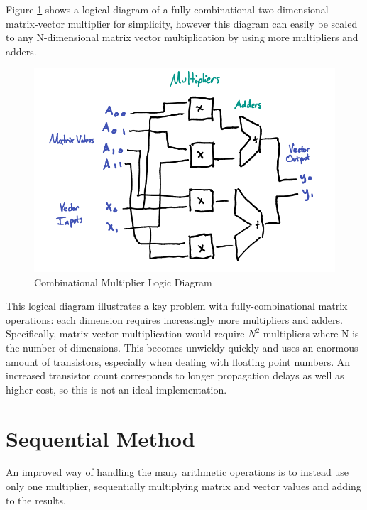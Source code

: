 \documentclass{article}
\begin{document}
Figure \ref{fig:comb_mult} shows a logical diagram of a fully-combinational two-dimensional matrix-vector multiplier for simplicity, however this diagram can easily be scaled to any N-dimensional matrix vector multiplication by using more multipliers and adders. 

\begin{figure}
    \centering  %
    \includegraphics[width = .8\textwidth]{Combinational_Multiplier.png}
    \caption{Combinational Multiplier Logic Diagram}
    \label{fig:comb_mult}
\end{figure}

This logical diagram illustrates a key problem with fully-combinational matrix operations: each dimension requires increasingly more multipliers and adders. Specifically, matrix-vector multiplication would require $N^2$ multipliers where N is the number of dimensions. This becomes unwieldy quickly and uses an enormous amount of transistors, especially when dealing with floating point numbers. An increased transistor count corresponds to longer propagation delays as well as higher cost, so this is not an ideal implementation.

\section{Sequential Method}
An improved way of handling the many arithmetic operations is to instead use only one multiplier, sequentially multiplying matrix and vector values and adding to the results.
\end{document}
